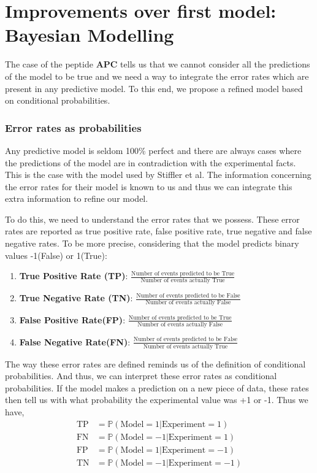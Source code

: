 \documentclass[a4paper, 12pt]{article}
\begin{document}
	
\part{Improvements over first model: Bayesian Modelling}
	
	The case of the peptide \textbf{APC} tells us that we cannot consider all the predictions of the model to be true and we need a way to integrate the error rates which are present in any predictive model. To this end, we propose a refined model based on conditional probabilities.
\section{Error rates as probabilities}
	Any predictive model is seldom 100\% perfect and there are always cases where the predictions of the model are in contradiction with the experimental facts. This is the case with the model used by Stiffler et al. The information concerning the error rates for their model is known to us and thus we can integrate this extra information to refine our model. 

	To do this, we need to understand the error rates that we possess. These error rates are reported as true positive rate, false positive rate, true negative and false negative rates. To be more precise, considering that the model predicts binary values -1(False) or 1(True):

	\begin{enumerate}
	\item 
	\textbf{True Positive Rate (TP)}: $\frac{\text{Number of events predicted to be True}}{\text{Number of events actually True}}$
	\item 
	\textbf{True Negative Rate (TN)}: $\frac{\text{Number of events predicted to be False}}{\text{Number of events actually False}}$
	\item 
	\textbf{False Positive Rate(FP)}: $\frac{\text{Number of events predicted to be True}}{\text{Number of events actually False}}$
	\item 
	\textbf{False Negative Rate(FN)}: $\frac{\text{Number of events predicted to be False}}{\text{Number of events actually True}}$
	\end{enumerate}

The way these error rates are defined reminds us of the definition of conditional probabilities. And thus, we can interpret these error rates as conditional probabilities. If the model makes a prediction on a new piece of data, these rates then tell us with what probability the experimental value was +1 or -1. Thus we have, 
\begin{align}
\label{inter_cond}
\text{TP} &= \mathbb{P}(\text{Model} = 1 | \text{Experiment} = 1) \\
\text{FN} &= \mathbb{P}(\text{Model} = -1 | \text{Experiment} = 1) \\
\text{FP} &= \mathbb{P}(\text{Model} = 1 | \text{Experiment} = -1) \\
\text{TN} &= \mathbb{P}(\text{Model} = -1 | \text{Experiment} = -1)
\end{align}
\end{document}
